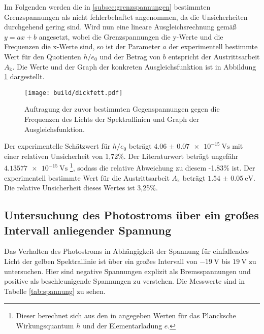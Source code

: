 Im Folgenden werden die in \ref{subsec:grenzspannungen} bestimmten Grenzspannungen
als nicht fehlerbehaftet angenommen, da die Unsicherheiten durchgehend gering sind.
Wird nun eine lineare Ausgleichsrechnung gemäß $y = ax+b$ angesetzt, wobei die Grenzspannungen
die y-Werte und die Frequenzen die x-Werte sind, so ist der Parameter $a$ der experimentell
bestimmte Wert für den Quotienten $h/e_0$ und der Betrag von $b$ entspricht der Austrittsarbeit
$A_\text{k}$. Die Werte und der Graph der konkreten Ausgleichsfunktion ist in  Abbildung \ref{fig:spannungfrequenz}
dargestellt.

\begin{figure}
  \centering
  \texttt{[image: build/dickfett.pdf]}
  \caption{Auftragung der zuvor bestimmten Gegenspannungen gegen die Frequenzen des Lichts der Spektrallinien und Graph der Ausgleichsfunktion.}
  \label{fig:spannungfrequenz}
\end{figure}

Der experimentelle Schätzwert für $h/e_0$ beträgt $\SI{4.06(007)e-15}{\volt\second}$ mit einer relativen Unsicherheit von 1,72\%.
Der Literaturwert beträgt ungefähr $\SI{4.13577e-15}{\volt\second}$ \footnote{Dieser berechnet
sich aus den in \cite{hunde_0} angegeben Werten für das Plancksche Wirkungsquantum $h$ und der Elementarladung $e$.},
sodass die relative Abweichung zu diesem -1.83\% ist.
Der experimentell bestimmte Wert für die Austrittsarbeit $A_\text{k}$ beträgt $\SI{1.54(005)}{\electronvolt}$.
Die relative Unsicherheit dieses Wertes ist 3,25\%.

\newpage
\subsection{Untersuchung des Photostroms über ein großes Intervall anliegender Spannung}
\label{subsec:drei}

Das Verhalten des Photostroms in Abhängigkeit der Spannung für einfallendes Licht
der gelben Spektrallinie ist über ein großes Intervall von $\SI{-19}{\volt}$ bis $\SI{19}{\volt}$
zu untersuchen. Hier sind negative Spannungen explizit als Bremsspannungen und positive als
beschleunigende Spannungen zu verstehen. Die Messwerte sind in Tabelle \ref{tab:spannung}
zu sehen.

